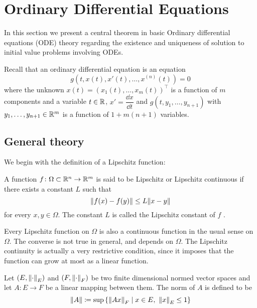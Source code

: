 
\section{Ordinary Differential Equations}

In this section we present a central theorem in basic Ordinary differential
equations (ODE) theory regarding the existence and uniqueness of solution to
initial value problems involving ODEs. 

Recall that an ordinary differential equation is an equation
\begin{equation}
	g(t, x(t), x'(t), \ldots, x^{(n)}(t)) = 0
\end{equation}
where the unknown $x(t) = (x_1(t), \ldots, x_m(t))^\top$ is a function of $m$
components and a variable $t \in \mathbb{R}$, $x' = \dfrac{\dd{x}}{\dd{t}}$ and $g(t,
y_1, \ldots, y_{n+1})$ with $y_1, \ldots, y_{n+1} \in \mathbb{R}^m$ is a function of
$1 + m(n+1)$ variables.

\subsection{General theory}

We begin with the definition of a Lipschitz function:

\begin{definition}
	A function $f \colon \Omega \subset \mathbb{R}^n \rightarrow \mathbb{R}^m$ is said to
	be Lipschitz or Lipschitz continuous if there exists a constant $L$ such
	that
	\begin{equation}
		\norm{f(x) - f(y)} \leq L \norm{x - y}
	\end{equation}
	for every $x, y \in \Omega$. The constant $L$ is called the
	Lipschitz constant of $f$ \cite{salsa2009chap1}.
\end{definition}

Every Lipschitz function on $\Omega$ is also a continuous function in the usual
sense on $\Omega$. The converse is not true in general, and depends on $\Omega$.
The Lipschitz continuity is actually a very restrictive condition, since it
imposes that the function can grow at most as a linear function. 

\begin{definition}
	Let $(E, \norm{\cdot}_E)$ and $(F, \norm{\cdot}_F)$ be two finite
	dimensional normed vector spaces and let $A \colon E \rightarrow F$ be a
	linear mapping between them. The norm of $A$ is defined to be
	\begin{equation}
		\norm{A}
		\coloneqq
		\sup{\left\{ \norm{A x}_F \mid x \in E, \ \norm{x}_E \leq 1 \right\}}
	\end{equation}
\end{definition}

